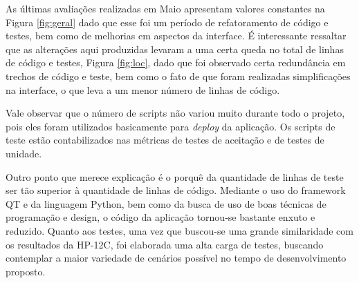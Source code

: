 As últimas avaliações realizadas em Maio apresentam valores constantes na Figura 
\ref{fig:geral} dado que esse foi um período de refatoramento de código e testes, bem como de melhorias em 
aspectos da interface. É interessante ressaltar que as alterações aqui produzidas levaram a uma certa queda 
no total de linhas de código e testes, Figura \ref{fig:loc}, dado que foi observado certa redundância em trechos 
de código e teste, bem como o fato de que foram realizadas simplificações na interface, o que leva a um menor 
número de linhas de código.

Vale observar que o número de scripts não variou muito durante todo o projeto, pois
eles foram utilizados basicamente para \textit{deploy} da aplicação. Os scripts de teste estão contabilizados
nas métricas de testes de aceitação e de testes de unidade.

Outro ponto que merece explicação é o porquê da quantidade de linhas de teste ser tão superior à quantidade 
de linhas de código. Mediante o uso do framework QT e da linguagem Python, bem como da busca de uso de boas 
técnicas de programação e design, o código da aplicação tornou-se bastante enxuto e reduzido. Quanto aos 
testes, uma vez que buscou-se uma grande similaridade com os resultados da HP-12C, foi elaborada uma alta 
carga de testes, buscando contemplar a maior variedade de cenários possível no tempo de desenvolvimento proposto.